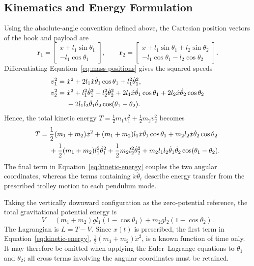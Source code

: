 \documentclass[a4paper,11pt]{article}
\begin{document}
\subsection{Kinematics and Energy Formulation}

Using the absolute-angle convention defined above, the Cartesian position
vectors of the hook and payload are
\begin{equation}
    \mathbf r_1=
    \begin{bmatrix}
        x+l_1\sin\theta_1\\
        -l_1\cos\theta_1
    \end{bmatrix},
    \qquad
    \mathbf r_2=
    \begin{bmatrix}
        x+l_1\sin\theta_1+l_2\sin\theta_2\\
        -l_1\cos\theta_1-l_2\cos\theta_2
    \end{bmatrix}.
    \label{eq:mass-positions}
\end{equation}
Differentiating Equation~\eqref{eq:mass-positions} gives the squared speeds
\begin{align}
    v_1^2={}&\dot{x}^2
        +2l_1\dot{x}\dot{\theta}_1\cos\theta_1
        +l_1^2\dot{\theta}_1^2,
        \label{eq:hook-speed}\\
    v_2^2={}&\dot{x}^2
        +l_1^2\dot{\theta}_1^2
        +l_2^2\dot{\theta}_2^2
        +2l_1\dot{x}\dot{\theta}_1\cos\theta_1
        +2l_2\dot{x}\dot{\theta}_2\cos\theta_2 \notag\\
        &+2l_1l_2\dot{\theta}_1\dot{\theta}_2
        \cos(\theta_1-\theta_2).
        \label{eq:payload-speed}
\end{align}
Hence, the total kinetic energy
\(T=\tfrac12m_1v_1^2+\tfrac12m_2v_2^2\) becomes
\begin{align}
    T={}&\frac12(m_1+m_2)\dot{x}^2
        +(m_1+m_2)l_1\dot{x}\dot{\theta}_1\cos\theta_1
        +m_2l_2\dot{x}\dot{\theta}_2\cos\theta_2 \notag\\
        &+\frac12(m_1+m_2)l_1^2\dot{\theta}_1^2
        +\frac12m_2l_2^2\dot{\theta}_2^2
        +m_2l_1l_2\dot{\theta}_1\dot{\theta}_2
        \cos(\theta_1-\theta_2).
    \label{eq:kinetic-energy}
\end{align}
The final term in Equation~\eqref{eq:kinetic-energy} couples the two angular
coordinates, whereas the terms containing \(\dot{x}\dot{\theta}_i\) describe
energy transfer from the prescribed trolley motion to each pendulum mode.

Taking the vertically downward configuration as the zero-potential reference,
the total gravitational potential energy is
\begin{equation}
    V=(m_1+m_2)gl_1(1-\cos\theta_1)
      +m_2gl_2(1-\cos\theta_2).
    \label{eq:potential-energy}
\end{equation}
The Lagrangian is \(L=T-V\). Since \(x(t)\) is prescribed, the first term in
Equation~\eqref{eq:kinetic-energy},
\(\tfrac12(m_1+m_2)\dot{x}^2\), is a known function of time only. It may
therefore be omitted when applying the Euler--Lagrange equations to
\(\theta_1\) and \(\theta_2\); all cross terms involving the angular
coordinates must be retained.
\end{document}
